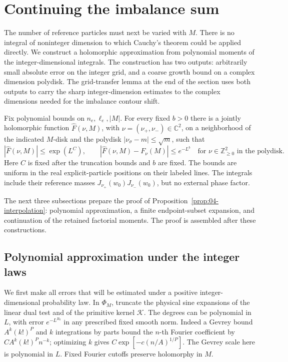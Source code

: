 \section{Continuing the imbalance sum}\label{sec:E-interpolation}

The number of reference particles must next be varied with \(M\).
There is no integral of noninteger dimension to which Cauchy's theorem
could be applied directly. We construct a holomorphic approximation
from polynomial moments of the integer-dimensional integrals. The
construction has two outputs: arbitrarily small absolute error on the
integer grid, and a coarse growth bound on a complex dimension polydisk.
The grid-transfer lemma at the end of the section uses both outputs to
carry the sharp integer-dimension estimates to the complex dimensions
needed for the imbalance contour shift.

\begin{proposition}\label{prop:04-interpolation}
Fix polynomial bounds on \(n_e,\ell_e,|M|\). For every fixed \(b>0\)
there is a jointly holomorphic function \(\widehat F(\nu,M)\), with
\(\nu=(\nu_+,\nu_-)\in\mathbb C^2\), on a neighborhood of the indicated \(M\)-disk and the polydisk
\(|\nu_\sigma-m|\le\sqrt m\), such that
\begin{equation}
 |\widehat F(\nu,M)|\le \exp(L^C),\qquad
 |\widehat F(\nu,M)-F_\nu(M)|\le e^{-L^b}
       \quad\text{for }\nu\in\mathbb Z_{\ge0}^2\text{ in the polydisk}.
 \label{eq:G-20}
\end{equation}
Here \(C\) is fixed after the truncation bounds and \(b\) are fixed.
The bounds are uniform in the real explicit-particle positions on their
labeled lines. The integrals include their reference masses
\(J_{\nu_+}(w_0)J_{\nu_-}(w_0)\), but no external phase factor.
\end{proposition}

The next three subsections prepare the proof of
Proposition~\ref{prop:04-interpolation}: polynomial approximation,
a finite endpoint-subset expansion, and continuation of the retained
factorial moments. The proof is assembled after these constructions.

\subsection{Polynomial approximation under the integer laws}

We first make all errors that will be estimated under a positive
integer-dimensional probability law. In \(\Phi_M\), truncate the
physical sine expansions of the linear dual test and of the primitive
kernel \(\mathscr K\). The degrees can be polynomial in \(L\), with
error \(e^{-L^{B_0}}\) in any prescribed fixed smooth norm. Indeed a
Gevrey bound \(A^k(k!)^P\) and \(k\) integrations by parts bound the
\(n\)-th Fourier coefficient by \(C A^k(k!)^P n^{-k}\);
optimizing \(k\) gives \(C\exp[-c(n/A)^{1/P}]\). The Gevrey scale
here is polynomial in \(L\). Fixed Fourier cutoffs preserve
holomorphy in \(M\).

